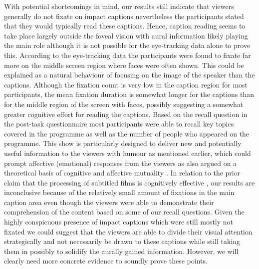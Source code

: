 \documentclass[output=paper]{langsci/langscibook}
\begin{document}
With potential shortcomings in mind, our results still indicate that viewers generally do not fixate on impact captions nevertheless the participants stated that they would typically read these captions.  Hence, caption reading seems to take place largely outside the foveal vision with aural information likely playing the main role although it is not possible for the eye-tracking data alone to prove this. According to the eye-tracking data the participants were found to fixate far more on the middle screen region where faces were often shown. This could be explained as a natural behaviour of focusing on the image of the speaker than the captions. Although the fixation count is very low in the caption region for most participants, the mean fixation duration is somewhat longer for the captions than for the middle region of the screen with faces, possibly suggesting a somewhat greater cognitive effort for reading the captions. Based on the recall question in the post-task questionnaire most participants were able to recall key topics covered in the programme as well as the number of people who appeared on the programme. This show is particularly designed to deliver new and potentially useful information to the viewers with humour as mentioned earlier, which could prompt affective (emotional) responses from the viewers as also argued on a theoretical basis of cognitive and affective mutuality \citep{Shiota2003, Sasamoto2014}. In relation to the prior claim that the processing of subtitled films is cognitively effective \citep{perego2010}, our results are inconclusive because of the relatively small amount of fixations in the main caption area even though the viewers were able to demonstrate their comprehension of the content based on some of our recall questions.  Given the highly conspicuous presence of impact captions which were still mostly not fixated we could suggest that the viewers are able to divide their visual attention strategically and not necessarily be drawn to these captions while still taking them in possibly to solidify the aurally gained information.  However, we will clearly need more concrete evidence to soundly prove these points. 
\end{document}
